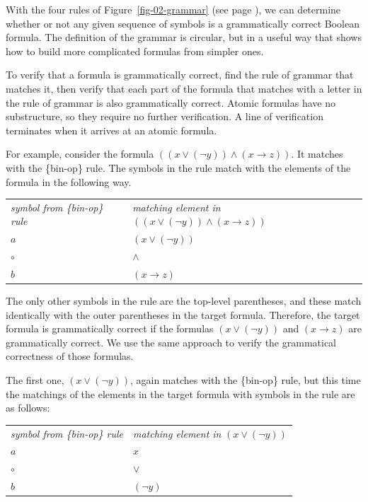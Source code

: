 With the four rules of Figure~\ref{fig-02-grammar} (see page \pageref{fig-02-grammar}),
we can determine whether or not any given sequence of symbols is a grammatically correct Boolean formula. The definition of the grammar is circular, but in a useful way that shows how to build more complicated formulas from simpler ones.

To verify that a formula is grammatically correct, find the rule of grammar that matches it, then verify that each part of the formula that matches with a letter in the rule of grammar is also grammatically correct. Atomic formulas have no substructure, so they require no further verification. A line of verification terminates when it arrives at an atomic formula.

For example, consider the formula $((x \vee (\neg y)) \wedge (x \rightarrow z))$. It matches with the \{bin-op\} rule. The symbols in the rule match with the elements of the formula in the following way.
\begin{center}
\begin{tabular}{ll}
\emph{symbol from \{bin-op\} rule}      & \emph{matching element in} $((x \vee (\neg y)) \wedge (x \rightarrow z))$ \\
$a$                                     & $(x \vee (\neg y))$ \\
$\circ$                                 & $\wedge$ \\
$b$                                     & $(x \rightarrow z)$ \\
\end{tabular}
\end{center}

The only other symbols in the rule are the top-level parentheses, and these match identically with the outer parentheses in the target formula. Therefore, the target formula is grammatically correct if the formulas $(x \vee (\neg y))$ and $(x \rightarrow z)$  are grammatically correct. We use the same approach to verify the grammatical correctness of those formulas.

The first one, $(x \vee (\neg y))$, again matches with the \{bin-op\} rule, but this time the matchings of the elements in the target formula with symbols in the rule are as follows:
\begin{center}
\begin{tabular}{ll}
\emph{symbol from \{bin-op\} rule}      & \emph{matching element in}  $(x \vee (\neg y))$ \\
$a$                                     & $x$ \\
$\circ$                                 & $\vee$ \\
$b$                                     & $(\neg y)$ \\
\end{tabular}
\end{center}

